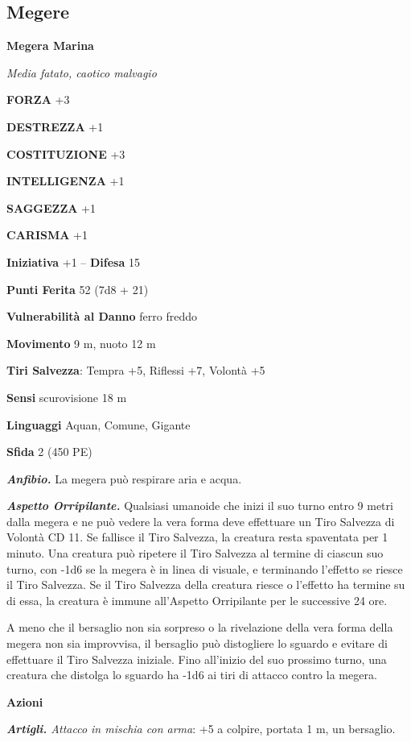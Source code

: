\begin{multicols}{2}
\subsection{Megere}

\medskip{}\textbf{Megera Marina}

\emph{Media fatato, caotico malvagio}

\textbf{FORZA} +3

\textbf{DESTREZZA} +1

\textbf{COSTITUZIONE} +3

\textbf{INTELLIGENZA} +1

\textbf{SAGGEZZA} +1

\textbf{CARISMA} +1

\textbf{Iniziativa} +1 -- \textbf{Difesa} 15

\textbf{Punti Ferita} 52 (7d8 + 21)

\textbf{Vulnerabilità al Danno} ferro freddo

\textbf{Movimento} 9 m, nuoto 12 m

\textbf{Tiri Salvezza}: Tempra +5, Riflessi +7, Volontà +5

\textbf{Sensi} scurovisione 18 m

\textbf{Linguaggi} Aquan, Comune, Gigante

\textbf{Sfida} 2 (450 PE)

\emph{\textbf{Anfibio.}} La megera può respirare aria e acqua.

\emph{\textbf{Aspetto Orripilante.}} Qualsiasi umanoide che inizi il suo turno entro 9 metri dalla megera e ne può vedere la vera forma deve effettuare un Tiro Salvezza di Volontà CD 11. Se fallisce il Tiro Salvezza, la creatura resta spaventata per 1 minuto. Una creatura può ripetere il Tiro Salvezza al termine di ciascun suo turno, con -1d6 se la megera è in linea di visuale, e terminando l'effetto se riesce il Tiro Salvezza. Se il Tiro Salvezza della creatura riesce o l'effetto ha termine su di essa, la creatura è immune all'Aspetto Orripilante per le successive 24 ore.

A meno che il bersaglio non sia sorpreso o la rivelazione della vera forma della megera non sia improvvisa, il bersaglio può distogliere lo sguardo e evitare di effettuare il Tiro Salvezza iniziale. Fino all'inizio del suo prossimo turno, una creatura che distolga lo sguardo
ha -1d6 ai tiri di attacco contro la megera.

\textbf{Azioni}

\emph{\textbf{Artigli.} Attacco in mischia con arma}: +5 a colpire,
portata 1 m, un bersaglio.


\end{multicols}

